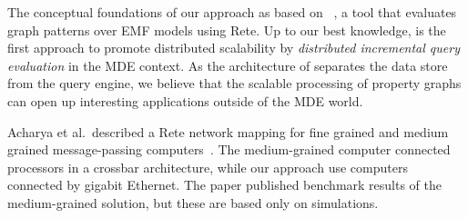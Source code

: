 The conceptual foundations of our approach as based on \eiq{}~\cite{models10}, a tool that evaluates graph patterns over EMF models using Rete. Up to our best knowledge, \iqd{} is the first approach to promote distributed scalability by \emph{distributed incremental query evaluation} in the MDE context. As the architecture of \iqd{} separates the data store from the query engine, we believe that the scalable processing of property graphs can open up interesting applications outside of the MDE world.

Acharya et al.\ described a Rete network mapping for fine grained and medium grained message-passing computers~\cite{message-passing-rete}. The medium-grained computer connected processors in a crossbar architecture, while our approach use computers connected by gigabit Ethernet. The paper published benchmark results of the medium-grained solution, but these are based only on simulations.
